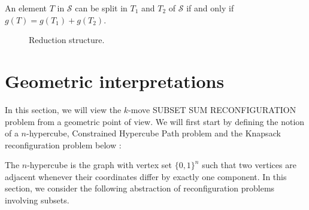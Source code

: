 \begin{example}
An element $T$ in $\mathcal{S}$ can be split in $T_1$ and $T_2$ of $\mathcal{S}$ if and only if $g(T) = g(T_1) + g(T_2)$.
\begin{figure}[H]
  \centering
  \begin{subfigure}[b]{0.4\textwidth}
    \begin{scaletikzpicturetowidth}{\textwidth}
    \end{scaletikzpicturetowidth}
    \caption{}
    \label{fig:standard_1}
  \end{subfigure}
  \begin{subfigure}[b]{0.4\textwidth}
    \begin{scaletikzpicturetowidth}{\textwidth}
    \end{scaletikzpicturetowidth}
    \caption{}
    \label{fig:standard_2}
  \end{subfigure}
  \caption{Reduction structure.}
  \label{fig:input_instance_standard}
\end{figure}
\end{example}


\section{Geometric interpretations} \label{sec:geometric}
In this section, we will view the $k$-move SUBSET SUM RECONFIGURATION problem from a geometric point of view.
We will first start by defining the notion of a $n$-hypercube, Constrained Hypercube Path problem and the Knapsack reconfiguration
problem below :

The $n$-hypercube is the graph with vertex set $\{0, 1\}^n$ such that two vertices are adjacent whenever their coordinates differ by
exactly one component. In this section, we consider the following abstraction of reconfiguration problems involving subsets.

